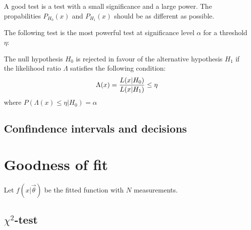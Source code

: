 {{	\begin{theorem}
    	A good test is a test with a small significance and a large power. The propabilities $P_{H_0}(x)$ and $P_{H_1}(x)$ should be as different as possible.
    \end{theorem}
    
    \begin{theorem}
    	The following test is the most powerful test at significance level $\alpha$ for a threshold $\eta$:
    	
        The null hypothesis $H_0$ is rejected in favour of the alternative hypothesis $H_1$ if the likelihood ratio $\Lambda$ satisfies the following condition: 
        \begin{equation}\index{likelihood!ratio}
			\label{statistics:likelihood_ratio}
            \Lambda(x) = \stylefrac{L(x|H_0)}{L(x|H_1)} \leq \eta
		\end{equation}
        where $P(\Lambda(x)\leq\eta|H_0) = \alpha $
    \end{theorem}
    
\subsection{Confindence intervals and decisions}

\section{Goodness of fit}
	
	Let $f(x|\vec{\theta})$ be the fitted function with $N$ measurements.
	
\subsection{\texorpdfstring{$\chi^2$}{chi square}-test}
    	
}}
